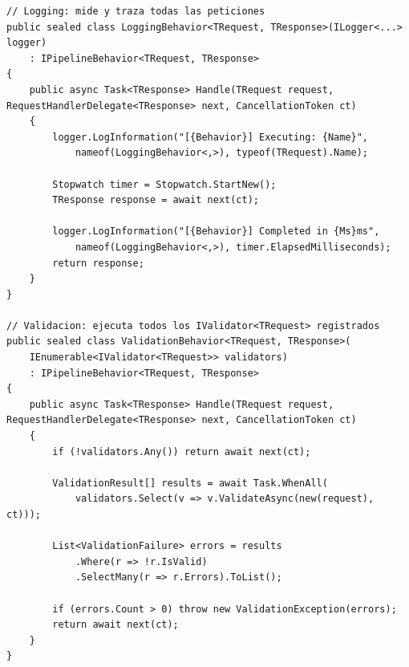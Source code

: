 \begin{lstlisting}[float=htbp, style=CSharp, caption={Implementación del patrón Decorator mediante Pipeline Behaviors para trazabilidad y validación.}, label={lst:decorator_mediatr}]
// Logging: mide y traza todas las peticiones
public sealed class LoggingBehavior<TRequest, TResponse>(ILogger<...> logger)
    : IPipelineBehavior<TRequest, TResponse>
{
    public async Task<TResponse> Handle(TRequest request, RequestHandlerDelegate<TResponse> next, CancellationToken ct)
    {
        logger.LogInformation("[{Behavior}] Executing: {Name}", 
            nameof(LoggingBehavior<,>), typeof(TRequest).Name);
            
        Stopwatch timer = Stopwatch.StartNew();
        TResponse response = await next(ct);
        
        logger.LogInformation("[{Behavior}] Completed in {Ms}ms", 
            nameof(LoggingBehavior<,>), timer.ElapsedMilliseconds);
        return response;
    }
}

// Validacion: ejecuta todos los IValidator<TRequest> registrados
public sealed class ValidationBehavior<TRequest, TResponse>(
    IEnumerable<IValidator<TRequest>> validators)
    : IPipelineBehavior<TRequest, TResponse>
{
    public async Task<TResponse> Handle(TRequest request, RequestHandlerDelegate<TResponse> next, CancellationToken ct)
    {
        if (!validators.Any()) return await next(ct);
        
        ValidationResult[] results = await Task.WhenAll(
            validators.Select(v => v.ValidateAsync(new(request), ct)));
            
        List<ValidationFailure> errors = results
            .Where(r => !r.IsValid)
            .SelectMany(r => r.Errors).ToList();
            
        if (errors.Count > 0) throw new ValidationException(errors);
        return await next(ct);
    }
}
\end{lstlisting}

